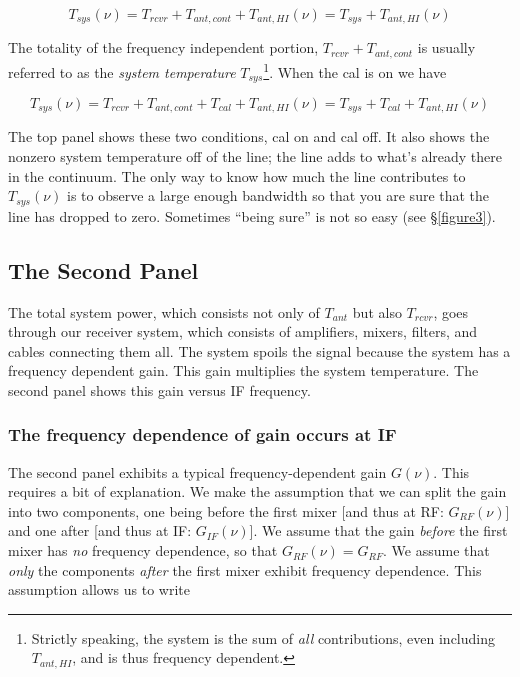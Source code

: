 \begin{mathletters}
\begin{equation} \label{tsyscalon}
T_{sys}(\nu) = T_{rcvr} + T_{ant, cont} + T_{ant, HI}(\nu) = 
	T_{sys}  + T_{ant, HI}(\nu) 
\end{equation}

\noindent The totality of the frequency independent portion, $T_{rcvr} +
T_{ant,cont}$ is usually referred to as the {\it system temperature}
$T_{sys}$\footnote{Strictly speaking, the system is the sum of {\it all}
contributions, even including $T_{ant,HI}$, and is thus frequency
dependent.}. When the cal is on we have

\begin{equation} \label{tsyscaloff}
T_{sys}(\nu) = T_{rcvr} + T_{ant, cont} + T_{cal} + T_{ant, HI}(\nu) = 
	T_{sys}  + T_{cal} + T_{ant, HI}(\nu) 
\end{equation}
\end{mathletters}

	The top panel shows these two conditions, cal on and cal off. It
also shows the nonzero system temperature off of the line; the line adds
to what's already there in the continuum. The only way to know how much
the line contributes to $T_{sys}(\nu)$ is to observe a large enough
bandwidth so that you are sure that the line has dropped to zero.
Sometimes ``being sure'' is not so easy (see \S \ref{figure3}).

\subsection{The Second Panel}

	The total system power, which consists not only of $T_{ant}$ but
also $T_{rcvr}$, goes through our receiver system, which consists of
amplifiers, mixers, filters, and cables connecting them all. The system
spoils the signal because the system has a frequency dependent gain.
This gain multiplies the system temperature. The second panel shows this
gain versus IF frequency.

\subsubsection{ The frequency dependence of gain occurs at IF}

	The second panel exhibits a typical frequency-dependent gain
$G(\nu)$. This requires a bit of explanation. We make the assumption
that we can split the gain into two components, one being before the
first mixer [and thus at RF: $G_{RF}(\nu)$] and one after [and thus at
IF: $G_{IF}(\nu)$]. We assume that the gain {\it before} the first mixer
has {\it no} frequency dependence, so that $G_{RF}(\nu) = G_{RF}$. We
assume that {\it only} the components {\it after} the first mixer
exhibit frequency dependence. This assumption allows us to write 

